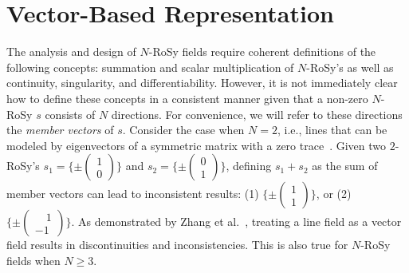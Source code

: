 \documentclass{acmsiggraph}               %
\begin{document}
\section{Vector-Based Representation}
\label{sec:representation}

The analysis and design of $N$-RoSy fields require coherent
definitions of the following concepts: summation and scalar
multiplication of $N$-RoSy's as well as continuity, singularity, and
differentiability. However, it is not immediately clear how to
define these concepts in a consistent manner given that a non-zero
$N$-RoSy $s$ consists of $N$ directions. For convenience, we will
refer to these directions the {\em member vectors} of $s$. Consider
the case when $N=2$, i.e., lines that can be modeled by eigenvectors
of a symmetric matrix with a zero trace~\cite{Zhang:07}. Given two
$2$-RoSy's $s_1 = \{ \pm
\begin{pmatrix} 1 \\ 0 \end{pmatrix} \}$ and $s_2 = \{ \pm
\begin{pmatrix} 0 \\ 1 \end{pmatrix} \}$, defining $s_1+s_2$
as the sum of member vectors can lead to inconsistent results: (1) $
\{ \pm
\begin{pmatrix} 1 \\ 1 \end{pmatrix} \}$, or (2) $\{ \pm
\begin{pmatrix} \quad 1 \\ -1 \end{pmatrix} \}$. As demonstrated by Zhang
et al.~, treating a line field as a vector field
results in discontinuities and inconsistencies. This is also true
for $N$-RoSy fields when $N \ge 3$.
\end{document}
